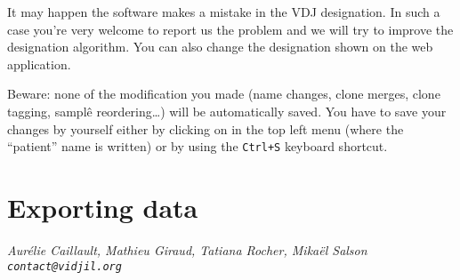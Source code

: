 \documentclass[11pt]{article}
\begin{document}
\bigskip

It may happen the software makes a mistake in the VDJ designation.
In such a case you're very welcome to report us the problem
and we will try to improve the designation algorithm.
You can also change the designation shown on the web application.

Beware: none of the modification you made (name changes, clone merges, clone
tagging, samplê reordering\dots) will be automatically saved. You have to save
your changes by yourself either by clicking on  in the top left menu (where the
``patient'' name is written) or by using the \texttt{Ctrl+S} keyboard
shortcut.

\section{Exporting data}





\vfill
\flushright \it Aurélie Caillault, Mathieu Giraud, Tatiana Rocher, Mikaël Salson
\\ \texttt{contact@vidjil.org}
\end{document}
